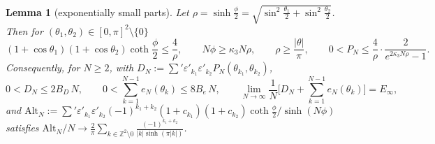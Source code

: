 \documentclass[11pt,a4paper]{article}
\newcommand{\Z}{\mathbb Z}
\theoremstyle{plain}
\newtheorem{lemma}[theorem]{Lemma}
\theoremstyle{definition}
\numberwithin{equation}{section}
\begin{document}
\begin{lemma}[exponentially small parts]\label{lem:small3}
Let $\rho=\sinh\frac\phi2=\sqrt{\sin^2\frac{\theta_1}2+\sin^2\frac{\theta_2}2}$. Then for $(\theta_1,\theta_2)\in[0,\pi]^2\setminus\{0\}$
\begin{equation}\label{eq:Pbound}
(1+\cos\theta_1)(1+\cos\theta_2)\coth\frac\phi2\le\frac4\rho,\qquad N\phi\ge\kappa_3N\rho,\qquad\rho\ge\frac{|\theta|}{\pi},\qquad
0<P_N\le\frac4\rho\cdot\frac{2}{e^{2\kappa_3N\rho}-1}.
\end{equation}
Consequently, for $N\ge2$, with $D_N:=\sum'\varepsilon'_{k_1}\varepsilon'_{k_2}P_N(\theta_{k_1},\theta_{k_2})$,
\begin{equation}\label{eq:DNe}
0<D_N\le2B_D\,N,\qquad0<\sum_{k=1}^{N-1}e_N(\theta_k)\le8B_e\,N,\qquad \lim_{N\to\infty}\frac1N\Big[D_N+\sum_{k=1}^{N-1}e_N(\theta_k)\Big]=E_\infty,
\end{equation}
and $\mathrm{Alt}_N:=\sum'\varepsilon'_{k_1}\varepsilon'_{k_2}(-1)^{k_1+k_2}(1+c_{k_1})(1+c_{k_2})\coth\frac\phi2/\sinh(N\phi)$ satisfies $\mathrm{Alt}_N/N\to\frac2\pi\sum_{k\in\Z^2\setminus0}\frac{(-1)^{k_1+k_2}}{|k|\sinh(\pi|k|)}$.
\end{lemma}
\end{document}
